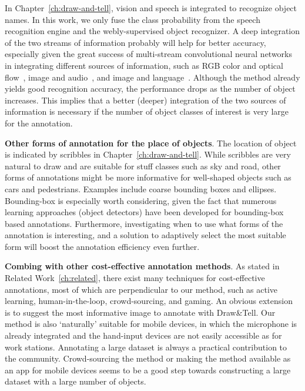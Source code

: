 
 
In Chapter~\ref{ch:draw-and-tell}, vision and speech is integrated to recognize object names. In this work, we only fuse the class probability from the speech recognition engine and the webly-supervised object recognizer. A deep integration of the two streams of information probably will help for better accuracy, especially given the great success of multi-stream convolutional neural networks in integrating different sources of information, such as RGB color and optical flow~\citep{two:stream:cnn}, image and audio~\citep{Noda2014}, and image and language~\citep{show:tell:caption}.  Although the method already yields good recognition accuracy, the performance drops as the number of object increases. This implies that a better (deeper) integration of the two sources of information is necessary if the number of object classes of interest is very large for the annotation.  


\textbf{Other forms of annotation for the place of objects}. The location of object is indicated by scribbles in Chapter~\ref{ch:draw-and-tell}. While scribbles are very natural to draw and  are suitable for stuff classes such as sky and road, other forms of annotations might be more informative for well-shaped objects such as cars and pedestrians. Examples include coarse bounding boxes and ellipses. Bounding-box is especially worth considering, given the fact that numerous learning approaches (\eg object detectors) have been developed for bounding-box based annotations.  Furthermore, investigating when to use what forms of the annotation is interesting, and a solution to adaptively select the most suitable form will boost the annotation efficiency even further.  


\textbf{Combing with other cost-effective annotation methods}. As stated in Related Work~\ref{ch:related}, there exist many techniques for cost-effective annotations, most of which are perpendicular to our method, such as active learning, human-in-the-loop, crowd-sourcing, and gaming.  An obvious extension is to suggest the most informative image to annotate with Draw\&Tell.
Our method is also `naturally'  suitable for mobile devices, in which the microphone is already integrated and the hand-input devices are not easily accessible as for work stations.  Annotating a large dataset is always a practical contribution to the community. 
Crowd-sourcing the method or making the method available as an app for mobile devices seems to be a good step towards constructing a large dataset with a large number of objects.  
 


